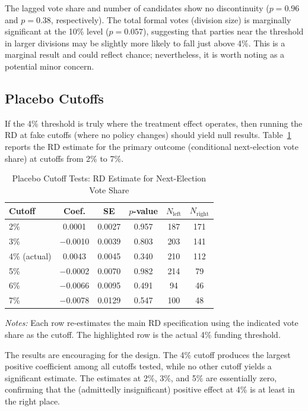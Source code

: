 \documentclass[12pt, a4paper]{article}
\begin{document}
The lagged vote share and number of candidates show no discontinuity ($p = 0.96$ and $p = 0.38$, respectively). The total formal votes (division size) is marginally significant at the 10\% level ($p = 0.057$), suggesting that parties near the threshold in larger divisions may be slightly more likely to fall just above 4\%. This is a marginal result and could reflect chance; nevertheless, it is worth noting as a potential minor concern.

\subsection{Placebo Cutoffs}

If the 4\% threshold is truly where the treatment effect operates, then running the RD at fake cutoffs (where no policy changes) should yield null results. Table~\ref{tab:placebo} reports the RD estimate for the primary outcome (conditional next-election vote share) at cutoffs from 2\% to 7\%.

\begin{table}[H]
\centering
\caption{Placebo Cutoff Tests: RD Estimate for Next-Election Vote Share}
\label{tab:placebo}
\begin{tabular}{lccccc}
\toprule
\textbf{Cutoff} & \textbf{Coef.} & \textbf{SE} & \textbf{$p$-value} & $N_{\text{left}}$ & $N_{\text{right}}$ \\
\midrule
2\% & 0.0001 & 0.0027 & 0.957 & 187 & 171 \\
3\% & $-$0.0010 & 0.0039 & 0.803 & 203 & 141 \\
\rowcolor{yellow!20} 4\% (actual) & 0.0043 & 0.0045 & 0.340 & 210 & 112 \\
5\% & $-$0.0002 & 0.0070 & 0.982 & 214 & 79 \\
6\% & $-$0.0066 & 0.0095 & 0.491 & 94 & 46 \\
7\% & $-$0.0078 & 0.0129 & 0.547 & 100 & 48 \\
\bottomrule
\end{tabular}
\begin{minipage}{\textwidth}
\vspace{0.3em}
\footnotesize
\textit{Notes:} Each row re-estimates the main RD specification using the indicated vote share as the cutoff. The highlighted row is the actual 4\% funding threshold.
\end{minipage}
\end{table}

The results are encouraging for the design. The 4\% cutoff produces the largest positive coefficient among all cutoffs tested, while no other cutoff yields a significant estimate. The estimates at 2\%, 3\%, and 5\% are essentially zero, confirming that the (admittedly insignificant) positive effect at 4\% is at least in the right place.
\end{document}
